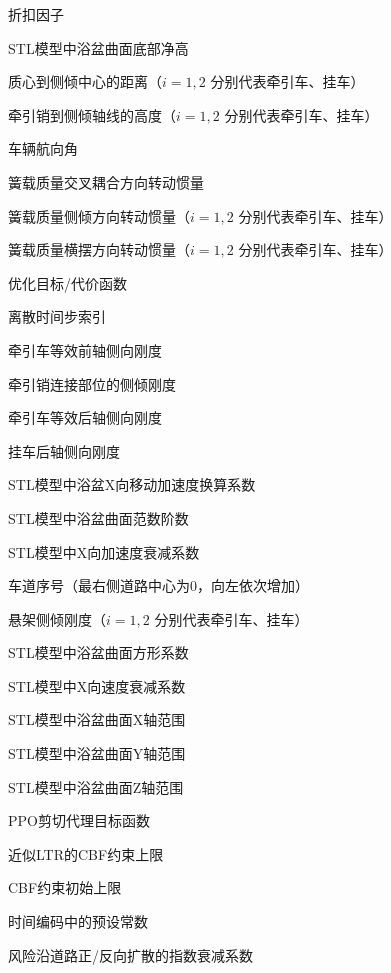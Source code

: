 \begin{denotation}[3cm]
  \item[{$\gamma$}] 折扣因子
  \item[$h$] STL模型中浴盆曲面底部净高
  \item[$h_i$] 质心到侧倾中心的距离（$i=1,2$ 分别代表牵引车、挂车）
  \item[$h_{ic}$] 牵引销到侧倾轴线的高度（$i=1,2$ 分别代表牵引车、挂车）
  \item[{$h_{veh}$}] 车辆航向角
  \item[{$I_{1xz}$}] 簧载质量交叉耦合方向转动惯量
  \item[{$I_{ixx}$}] 簧载质量侧倾方向转动惯量（$i=1,2$ 分别代表牵引车、挂车）
  \item[{$I_{izz}$}] 簧载质量横摆方向转动惯量（$i=1,2$ 分别代表牵引车、挂车）
  \item[{$J$}] 优化目标/代价函数
  \item[$k$] 离散时间步索引
  \item[$k_1$] 牵引车等效前轴侧向刚度
  \item[$k_{12}$] 牵引销连接部位的侧倾刚度
  \item[$k_2$] 牵引车等效后轴侧向刚度
  \item[$k_3$] 挂车后轴侧向刚度
  \item[{$k_{a,dec}$}] STL模型中浴盆X向移动加速度换算系数
  \item[{$k_{\alpha}$}] STL模型中浴盆曲面范数阶数
  \item[{$k_{ax,pow}$}] STL模型中X向加速度衰减系数
  \item[$k_{lane}$] 车道序号（最右侧道路中心为0，向左依次增加）
  \item[$k_{ri}$] 悬架侧倾刚度（$i=1,2$ 分别代表牵引车、挂车）
  \item[{$k_{\sigma}$}] STL模型中浴盆曲面方形系数
  \item[{$k_{v,dec}$}] STL模型中X向速度衰减系数
  \item[{$k_x$}] STL模型中浴盆曲面X轴范围
  \item[{$k_y$}] STL模型中浴盆曲面Y轴范围
  \item[{$k_z$}] STL模型中浴盆曲面Z轴范围
  \item[{$L^{\text{CLIP}}(\bm{\theta})$}] PPO剪切代理目标函数
  \item[{$\mathcal{L}_{lim}$}] 近似LTR的CBF约束上限
  \item[{$\mathcal{L}_{lim}^0$}] CBF约束初始上限
  \item[{$L_{\max}$}] 时间编码中的预设常数
  \item[{$\lambda_f,\lambda_b$}] 风险沿道路正/反向扩散的指数衰减系数

\end{denotation}
